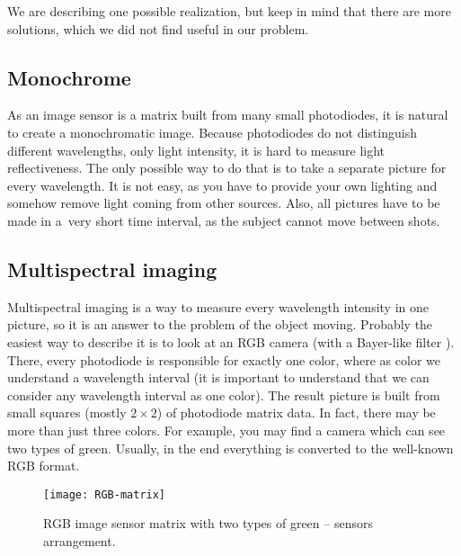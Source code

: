         We are describing one possible realization, but keep in mind that
        there are more solutions, which we did not find useful in our problem.

        \subsection*{Monochrome}
            As an image sensor is a matrix built from many small photodiodes,
            it is natural to create a monochromatic image.
            Because photodiodes do not distinguish different
            wavelengths, only light intensity, it is hard
            to measure light reflectiveness.
            The only possible way to do that is to
            take a separate picture for every wavelength.
            It is not easy, as you have to
            provide your own lighting and somehow remove
            light coming from other sources.
            Also, all pictures have to be made in
            a~very short time interval, as the subject
            cannot move between shots.

        \subsection*{Multispectral imaging}
            Multispectral imaging is a way to measure every wavelength intensity
            in one picture, so it is an answer to the problem of the object moving.
            Probably the easiest way to describe it is to look at an RGB camera
            (with a Bayer-like filter \cite{bayerfilter}).
            There, every photodiode is responsible for exactly one color,
            where as color we understand a wavelength interval (it is important
            to understand that we can consider any wavelength interval as one color).
            The result picture is built from small squares (mostly $2 \times 2$)
            of photodiode matrix data.
            In fact, there may be more than just three colors.
            For example, you may find a camera which can see two types of green.
            Usually, in the end everything is converted to the well-known RGB format.

            \begin{figure}[H]
                \caption{RGB image sensor matrix with two types of green -- sensors arrangement.}
                \centering
                \texttt{[image: RGB-matrix]}
                \label{fig:RGB-matrix}
            \end{figure}

